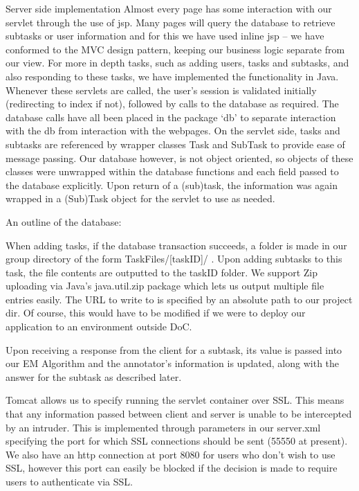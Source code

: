 \documentclass[11pt]{article}
\begin{document}
Server side implementation
Almost every page has some interaction with our servlet through the use of jsp.
Many pages will query the database to retrieve subtasks or user information and for
this we have used inline jsp -- we have conformed to the MVC design pattern, keeping
our business logic separate from our view. For more in depth tasks, such as
adding users, tasks and subtasks, and also responding
to these tasks, we have implemented the functionality in Java. Whenever these servlets
are called, the user's session is validated initially (redirecting to index if not),
followed by calls to the database as required. The database calls have all been placed
in the package `db' to separate interaction with the db from interaction with the webpages.
On the servlet side, tasks and subtasks are referenced by wrapper classes Task and SubTask
to provide ease of message passing. Our database however, is not object oriented, so
objects of these classes were unwrapped within the database functions and each field
passed to the database explicitly. Upon return of a (sub)task, the information was again
wrapped in a (Sub)Task object for the servlet to use as needed.

An outline of the database:

When adding tasks, if the database transaction succeeds, a folder is made in our group
directory of the form TaskFiles/[taskID]/ . Upon adding subtasks to this task, the
file contents are outputted to the taskID folder. We support Zip uploading via
Java's java.util.zip package which lets us output multiple file entries easily.
The URL to write to is specified by an absolute path to our project dir. Of course, this would
have to be modified if we were to deploy our application to an environment outside DoC.

Upon receiving a response from the client for a subtask, its value is passed into our
EM Algorithm and the annotator's information is updated, along with the answer for the
subtask as described later.

Tomcat allows us to specify running the servlet container over SSL. This means
that any information passed between client and server is unable to be intercepted
by an intruder. This is implemented through parameters in our server.xml specifying
the port for which SSL connections should be sent (55550 at present). We also have
an http connection at port 8080 for users who don't wish to use SSL, however this port can
easily be blocked if the decision is made to require users to authenticate via SSL.
\end{document}
